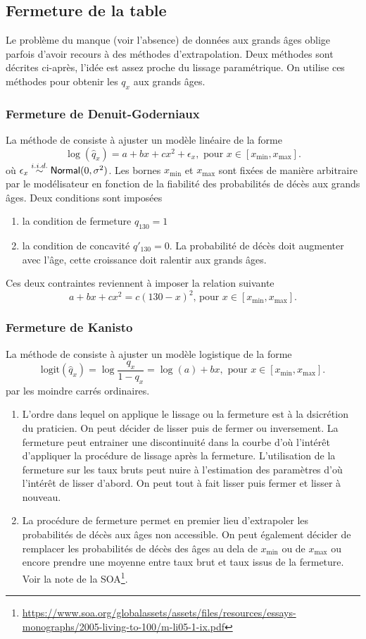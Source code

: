 \subsection{Fermeture de la table}
Le problème du manque (voir l'absence) de données aux grands âges oblige parfois d'avoir recours à des méthodes d'extrapolation. Deux méthodes sont décrites ci-après, l'idée est assez proche du lissage paramétrique. On utilise ces méthodes pour obtenir les $q_x$ aux grands âges. 

\subsubsection{Fermeture de Denuit-Goderniaux}
La méthode de \citet{Denuit2005} consiste à ajuster un modèle linéaire de la forme
$$
\log(\widehat{q}_x) = a + bx + cx^2+\epsilon_x,\text{ pour }x\in [x_{\min}, x_{\max}].
$$
où $\epsilon_x\overset{i.i.d.}{\sim}\mathsf{Normal}(0,\sigma^2)$. Les bornes $x_{\min}$ et $x_{\max}$ sont fixées de manière arbitraire par le modélisateur en fonction de la fiabilité des probabilités de décès aux grands âges. Deux conditions sont imposées
\begin{enumerate}
  \item la condition de fermeture $q_{130} = 1$
  \item la condition de concavité $q'_{130} = 0$. La probabilité de décès doit augmenter avec l'âge, cette croissance doit ralentir aux grands âges.
\end{enumerate}
Ces deux contraintes reviennent à imposer la relation suivante 
$$
a+bx+cx^2 = c(130-x)^2\text{, pour }x\in[x_{\min}, x_{\max}].
$$

\subsubsection{Fermeture de Kanisto}
La méthode de \citet{Thatcher1998} consiste à ajuster un modèle logistique de la forme
$$
\text{logit}(\widehat{q}_x) = \log\frac{q_x}{1-q_x}=\log(a) + bx,\text{ pour }x\in[x_{\min}, x_{\max}].
$$
par les moindre carrés ordinaires.
\begin{remark}
\begin{enumerate}
  \item L'ordre dans lequel on applique le lissage ou la fermeture est à la dsicrétion du praticien. On peut décider de lisser puis de fermer ou inversement. La fermeture peut entrainer une discontinuité dans la courbe d'où l'intérêt d'appliquer la procédure de lissage après la fermeture. L'utilisation de la fermeture sur les taux bruts peut nuire à l'estimation des paramètres d'où l'intérêt de lisser d'abord. On peut tout à fait lisser puis fermer et lisser à nouveau.
  \item La procédure de fermeture permet en premier lieu d'extrapoler les probabilités de décès aux âges non accessible. On peut également décider de remplacer les probabilités de décès des âges au dela de  $x_{\min}$ ou de  $x_{\max}$ ou encore prendre une moyenne entre taux brut et taux issus de la fermeture. Voir la note de la SOA\footnote{\url{https://www.soa.org/globalassets/assets/files/resources/essays-monographs/2005-living-to-100/m-li05-1-ix.pdf}}.
\end{enumerate}
\end{remark}
